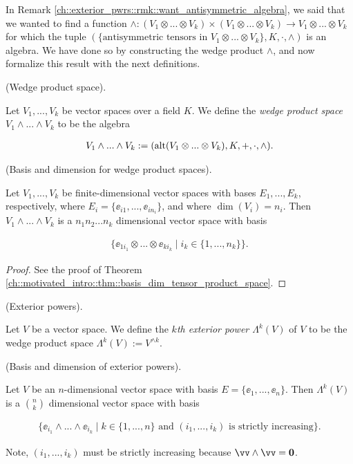 In Remark \ref{ch::exterior_pwrs::rmk::want_antisymmetric_algebra}, we said that we wanted to find a function $\wedge:(V_1 \otimes ... \otimes V_k) \times (V_1 \otimes ... \otimes V_k) \rightarrow V_1 \otimes ... \otimes V_k$ for which the tuple $(\{\text{antisymmetric tensors in $V_1 \otimes ... \otimes V_k$}\}, K, \cdot, \wedge )$ is an algebra. We have done so by constructing the wedge product $\wedge$, and now formalize this result with the next definitions.

\begin{defn}
    (Wedge product space). 
    
    Let $V_1, ..., V_k$ be vector spaces over a field $K$. We define the \textit{wedge product space} $V_1 \wedge ... \wedge V_k$ to be the algebra 
    
    \begin{align*}
        V_1 \wedge ... \wedge V_k := (\text{alt}(V_1 \otimes ... \otimes V_k), K, +, \cdot, \wedge).
    \end{align*}
\end{defn}

\begin{theorem}
    (Basis and dimension for wedge product spaces).
    
    Let $V_1, ..., V_k$ be finite-dimensional vector spaces with bases $E_1, ..., E_k$, respectively, where $E_i = \{\ee_{i1}, ..., \ee_{in_i}\}$, and where $\dim(V_i) = n_i$. Then $V_1 \wedge ... \wedge V_k$ is a $n_1 n_2 ... n_k$ dimensional vector space with basis
    
    \begin{align*}
        \{ \ee_{1i_1} \otimes ... \otimes \ee_{ki_k} \mid i_k \in \{1, ..., n_k\} \}.
    \end{align*}
\end{theorem}

\begin{proof}
   See the proof of Theorem \ref{ch::motivated_intro::thm::basis_dim_tensor_product_space}.
\end{proof}

\begin{theorem}
    (Exterior powers).
    
    Let $V$ be a vector space. We define the \textit{$k$th exterior power $\Lambda^k(V)$} of $V$ to be the wedge product space $\Lambda^k(V) := V^{\wedge k}$.
\end{theorem}

\begin{theorem}
    (Basis and dimension of exterior powers).
    
    Let $V$ be an $n$-dimensional vector space with basis $E = \{\ee_1, ..., \ee_n\}$. Then $\Lambda^k(V)$ is a $\binom{n}{k}$ dimensional vector space with basis
    
    \begin{align*}
        \{ \ee_{i_1} \wedge ... \wedge \ee_{i_k} \mid k \in \{1, ..., n\} \text{ and } (i_1, ..., i_k) \text{ is strictly increasing} \}.
    \end{align*}
    
    Note, $(i_1, ..., i_k)$ must be strictly increasing because $\vv \wedge \vv = \mathbf{0}$.
\end{theorem}

